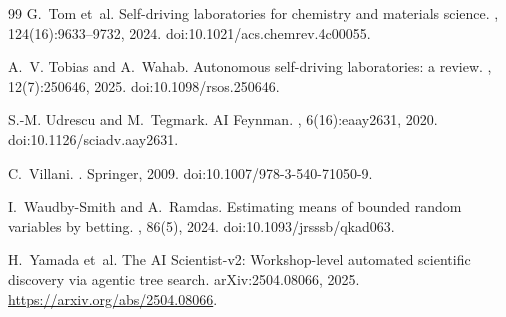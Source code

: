\documentclass[11pt,a4paper]{article}
\begin{document}
\begin{thebibliography}{99}
G.~Tom et~al.
\newblock Self-driving laboratories for chemistry and materials science.
, 124(16):9633--9732, 2024. doi:10.1021/acs.chemrev.4c00055.

A.~V. Tobias and A.~Wahab.
\newblock Autonomous self-driving laboratories: a review.
, 12(7):250646, 2025. doi:10.1098/rsos.250646.

S.-M. Udrescu and M.~Tegmark.
\newblock AI Feynman.
, 6(16):eaay2631, 2020. doi:10.1126/sciadv.aay2631.

C.~Villani.
.
\newblock Springer, 2009. doi:10.1007/978-3-540-71050-9.

I.~Waudby-Smith and A.~Ramdas.
\newblock Estimating means of bounded random variables by betting.
, 86(5), 2024.
\newblock doi:10.1093/jrsssb/qkad063.

H.~Yamada et~al.
\newblock The AI Scientist-v2: Workshop-level automated scientific discovery via agentic tree search.
\newblock arXiv:2504.08066, 2025.
\newblock \url{https://arxiv.org/abs/2504.08066}.

\end{thebibliography}
\end{document}
